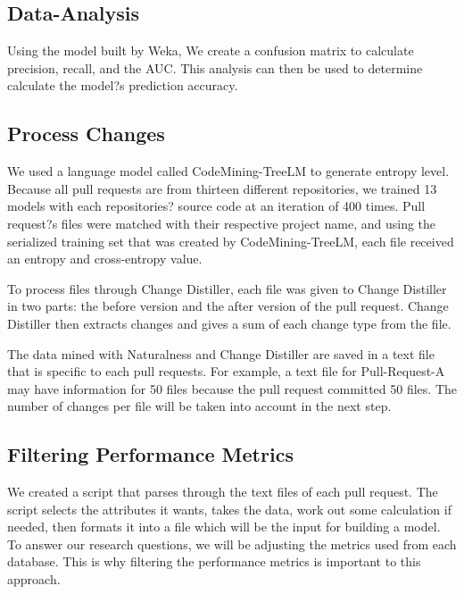 \documentclass[10pt, conference]{IEEEtran}
\begin{document}
\subsection{Data-Analysis}
Using the model built by Weka, We create a confusion matrix to calculate precision, recall, and the AUC. This analysis can then be used to determine calculate the model?s prediction accuracy.

\subsection{Process Changes}
We used a language model called CodeMining-TreeLM to generate entropy level. Because all pull requests are from thirteen different repositories, we trained 13 models with each repositories? source code at an iteration of 400 times. Pull request?s files were matched with their respective project name, and using the serialized training set that was created by CodeMining-TreeLM, each file received an entropy and cross-entropy value.

To process files through Change Distiller, each file was given to Change Distiller in two parts: the before version and the after version of the pull request. Change Distiller then extracts changes and gives a sum of each change type from the file. 

The data mined with Naturalness and Change Distiller are saved in a text file that is specific to each pull requests. For example, a text file for Pull-Request-A may have information for 50 files because the pull request committed 50 files. The number of changes per file will be taken into account in the next step.

\subsection{Filtering Performance Metrics}
We created a script that parses through the text files of each pull request. The script selects the attributes it wants, takes the data, work out some calculation if needed, then formats it into a file which will be the input for building a model. To answer our research questions, we will be adjusting the metrics used from each database. This is why filtering the performance metrics is important to this approach.
\end{document}
